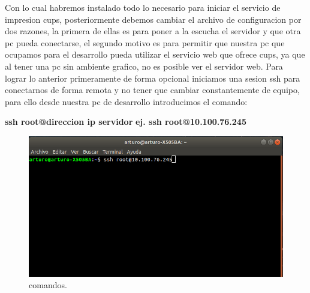 Con lo cual habremos instalado todo lo necesario para iniciar el servicio de impresion cups, posteriormente debemos cambiar el archivo de configuracion por dos razones, la primera de ellas es para poner a la escucha el servidor y que otra pc pueda conectarse, el segundo motivo es para permitir que nuestra pc que ocupamos para el desarrollo pueda utilizar el servicio web que ofrece cups, ya que al tener una pc sin ambiente grafico, no es posible ver el servidor web. Para lograr lo anterior primeramente de forma opcional iniciamos una sesion ssh para conectarnos de forma remota y no tener que cambiar constantemente de equipo, para ello desde nuestra pc de desarrollo introducimos el comando:
\\
\begin{center}
\textbf{ssh root@direccion ip servidor}
\textbf{ej. ssh root@10.100.76.245}
\end {center}
\FloatBarrier
\begin{figure}[htbp!]
		\centering
			\includegraphics[width=.9\textwidth]{images/r2}
		\caption{comandos.}
		\label{image:r2}
\end{figure}
\FloatBarrier

